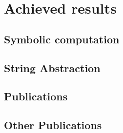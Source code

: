 \chapter{Achieved results}
\label{ch:results}


\section{Symbolic computation}
\label{sec:symbolic}

\section{String Abstraction}
\label{sec:string}

\section{Publications}
\label{sec:publications}

\section{Other Publications}
